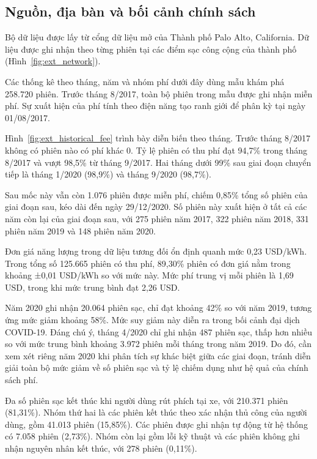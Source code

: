 \documentclass[conference,a4paper]{IEEEtran}
\begin{document}
\subsection{Nguồn, địa bàn và bối cảnh chính sách}

Bộ dữ liệu được lấy từ cổng dữ liệu mở của Thành phố Palo Alto, California. Dữ liệu được ghi nhận theo từng phiên tại các điểm sạc công cộng của thành phố (Hình~\ref{fig:ext_network}).

Các thống kê theo tháng, năm và nhóm phí dưới đây dùng mẫu khám phá 258.720 phiên. Trước tháng 8/2017, toàn bộ phiên trong mẫu được ghi nhận miễn phí. Sự xuất hiện của phí tính theo điện năng tạo ranh giới để phân kỳ tại ngày 01/08/2017.

Hình~\ref{fig:ext_historical_fee} trình bày diễn biến theo tháng. Trước tháng 8/2017 không có phiên nào có phí khác 0. Tỷ lệ phiên có thu phí đạt 94,7\% trong tháng 8/2017 và vượt 98,5\% từ tháng 9/2017. Hai tháng dưới 99\% sau giai đoạn chuyển tiếp là tháng 1/2020 (98,9\%) và tháng 9/2020 (98,7\%).

Sau mốc này vẫn còn 1.076 phiên được miễn phí, chiếm 0,85\% tổng số phiên của giai đoạn sau, kéo dài đến ngày 29/12/2020. Số phiên này xuất hiện ở tất cả các năm còn lại của giai đoạn sau, với 275 phiên năm 2017, 322 phiên năm 2018, 331 phiên năm 2019 và 148 phiên năm 2020.

Đơn giá năng lượng trong dữ liệu tương đối ổn định quanh mức 0,23 USD/kWh. Trong tổng số 125.665 phiên có thu phí, 89,30\% phiên có đơn giá nằm trong khoảng ±0,01 USD/kWh so với mức này. Mức phí trung vị mỗi phiên là 1,69 USD, trong khi mức trung bình đạt 2,26 USD.

Năm 2020 ghi nhận 20.064 phiên sạc, chỉ đạt khoảng 42\% so với năm 2019, tương ứng mức giảm khoảng 58\%. Mức suy giảm này diễn ra trong bối cảnh đại dịch COVID-19. Đáng chú ý, tháng 4/2020 chỉ ghi nhận 487 phiên sạc, thấp hơn nhiều so với mức trung bình khoảng 3.972 phiên mỗi tháng trong năm 2019. Do đó, cần xem xét riêng năm 2020 khi phân tích sự khác biệt giữa các giai đoạn, tránh diễn giải toàn bộ mức giảm về số phiên sạc và tỷ lệ chiếm dụng như hệ quả của chính sách phí.

Đa số phiên sạc kết thúc khi người dùng rút phích tại xe, với 210.371 phiên (81,31\%). Nhóm thứ hai là các phiên kết thúc theo xác nhận thủ công của người dùng, gồm 41.013 phiên (15,85\%). Các phiên được ghi nhận tự động từ hệ thống có 7.058 phiên (2,73\%). Nhóm còn lại gồm lỗi kỹ thuật và các phiên không ghi nhận nguyên nhân kết thúc, với 278 phiên (0,11\%).
\end{document}
